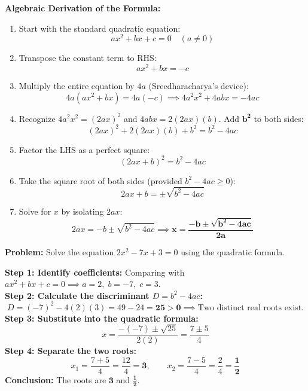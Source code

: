 \documentclass[10pt,a4paper]{article}
\begin{document}
\begin{formulaBox}
  \textbf{Algebraic Derivation of the Formula:}
  \begin{enumerate}
    \item Start with the standard quadratic equation:
      $$ax^2 + bx + c = 0 \quad (a \neq 0)$$
    \item Transpose the constant term to RHS:
      $$ax^2 + bx = -c$$
    \item Multiply the entire equation by $4a$ (Sreedharacharya's device):
      $$4a(ax^2 + bx) = 4a(-c) \implies 4a^2 x^2 + 4abx = -4ac$$
    \item Recognize $4a^2 x^2 = (2ax)^2$ and $4abx = 2(2ax)(b)$. Add $\mathbf{b^2}$ to both sides:
      $$(2ax)^2 + 2(2ax)(b) + b^2 = b^2 - 4ac$$
    \item Factor the LHS as a perfect square:
      $$(2ax + b)^2 = b^2 - 4ac$$
    \item Take the square root of both sides (provided $b^2 - 4ac \ge 0$):
      $$2ax + b = \pm \sqrt{b^2 - 4ac}$$
    \item Solve for $x$ by isolating $2ax$:
      $$2ax = -b \pm \sqrt{b^2 - 4ac} \implies \mathbf{x = \frac{-b \pm \sqrt{b^2 - 4ac}}{2a}}$$
  \end{enumerate}
\end{formulaBox}

\vspace{0.8mm}
\begin{conceptBox}[title={Worked Archetype 4 $\vert$ Application of the Quadratic Formula},fonttitle=\bfseries\color{navy}]
  \textbf{Problem:} Solve the equation $2x^2 - 7x + 3 = 0$ using the quadratic formula.
  \par\vspace{0.6mm}\noindent
  \textbf{Step 1: Identify coefficients:} Comparing with $ax^2 + bx + c = 0 \implies a = 2, \; b = -7, \; c = 3$.\\
  \textbf{Step 2: Calculate the discriminant $D = b^2 - 4ac$:}
  $$D = (-7)^2 - 4(2)(3) = 49 - 24 = \mathbf{25 > 0} \implies \text{Two distinct real roots exist.}$$
  \textbf{Step 3: Substitute into the quadratic formula:}
  $$x = \frac{-(-7) \pm \sqrt{25}}{2(2)} = \frac{7 \pm 5}{4}$$
  \textbf{Step 4: Separate the two roots:}
  $$x_1 = \frac{7 + 5}{4} = \frac{12}{4} = \mathbf{3}, \qquad x_2 = \frac{7 - 5}{4} = \frac{2}{4} = \mathbf{\frac{1}{2}}$$
  \textbf{Conclusion:} The roots are $\mathbf{3}$ and $\mathbf{\frac{1}{2}}$.
\end{conceptBox}

\newpage
\end{document}
